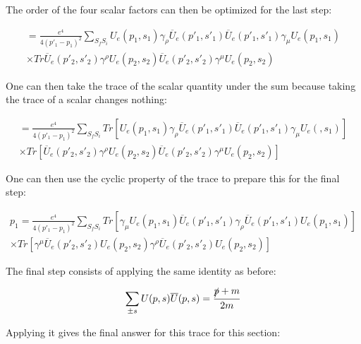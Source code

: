 \documentclass[a4]{article}
\begin{document}
    The order of the four scalar factors can then be optimized for the last step:

    \begin{eqnarray}
        = \frac{e^4}{4 (p'_1 - p_1)^2} \sum_{S_f S_i} U_e (p_1, s_1) \gamma_{\rho} \overline{U}_e (p'_1, s'_1) \overline{U}_e (p'_1, s'_1) \gamma_{\mu} U_e (p_1, s_1) \\
        \times Tr \overline{U}_e (p'_2, s'_2) \gamma^{\rho} U_e (p_2, s_2) \overline{U}_e (p'_2, s'_2) \gamma^{\mu} U_e (p_2, s_2)
    \end{eqnarray}

    One can then take the trace of the scalar quantity under the sum because taking the trace of a scalar changes nothing:

    \begin{eqnarray}
        = \frac{e^4}{4 (p'_1 - p_1)^2} \sum_{S_f S_i} Tr [U_e (p_1, s_1) \gamma_{\rho} \overline{U}_e (p'_1, s'_1) \overline{U}_e (p'_1, s'_1) \gamma_{\mu} U_e (, s_1)] \\
        \times Tr [\overline{U}_e (p'_2, s'_2) \gamma^{\rho} U_e (p_2, s_2) \overline{U}_e (p'_2, s'_2) \gamma^{\mu} U_e (p_2, s_2)]
    \end{eqnarray}

    One can then use the cyclic property of the trace to prepare this for the final step:

    \begin{eqnarray}p_1
        = \frac{e^4}{4 (p'_1 - p_1)^2} \sum_{S_f S_i} Tr [\gamma_{\mu} U_e (p_1, s_1) \overline{U}_e (p'_1, s'_1) \gamma_{\rho} \overline{U}_e (p'_1, s'_1) U_e (p_1, s_1)] \\
        \times Tr [\gamma^{\mu} \overline{U}_e (p'_2, s'_2) U_e (p_2, s_2) \gamma^{\rho} \overline{U}_e (p'_2, s'_2) U_e (p_2, s_2)]
    \end{eqnarray}

    The final step consists of applying the same identity as before:

    \begin{equation}
        \sum_{\pm s} U (p, s) \overline{U} (p, s) = \frac{\slashed{p} + m}{2m}
    \end{equation}

    Applying it gives the final answer for this trace for this section:

    \begin{center}
    \end{center}
\end{document}
